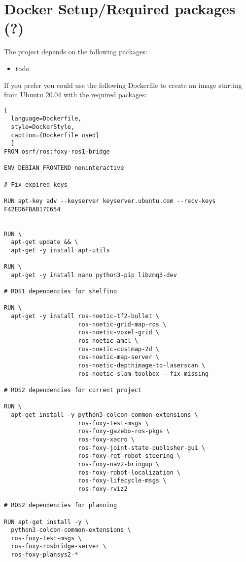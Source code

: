\chapter{Docker Setup/Required packages (?)}
\label{cha:dockerfile}

The project depends on the following packages:

\begin{itemize}
    \item todo
\end{itemize}

If you prefer you could use the following Dockerfile to create an image starting from Ubuntu 20.04 with the required packages:

\begin{lstlisting}[
  language=Dockerfile,
  style=DockerStyle,
  caption={Dockerfile used}
  ]
FROM osrf/ros:foxy-ros1-bridge

ENV DEBIAN_FRONTEND noninteractive

# Fix expired keys

RUN apt-key adv --keyserver keyserver.ubuntu.com --recv-keys F42ED6FBAB17C654


RUN \
  apt-get update && \
  apt-get -y install apt-utils

RUN \
  apt-get -y install nano python3-pip libzmq3-dev

# ROS1 dependencies for shelfino
  
RUN \
  apt-get -y install ros-noetic-tf2-bullet \
                     ros-noetic-grid-map-ros \
                     ros-noetic-voxel-grid \
                     ros-noetic-amcl \
                     ros-noetic-costmap-2d \
                     ros-noetic-map-server \
                     ros-noetic-depthimage-to-laserscan \
                     ros-noetic-slam-toolbox --fix-missing

# ROS2 dependencies for current project

RUN \
  apt-get install -y python3-colcon-common-extensions \
                     ros-foxy-test-msgs \
                     ros-foxy-gazebo-ros-pkgs \
                     ros-foxy-xacro \
                     ros-foxy-joint-state-publisher-gui \
                     ros-foxy-rqt-robot-steering \
                     ros-foxy-nav2-bringup \
                     ros-foxy-robot-localization \
                     ros-foxy-lifecycle-msgs \
                     ros-foxy-rviz2

# ROS2 dependencies for planning

RUN apt-get install -y \
  python3-colcon-common-extensions \
  ros-foxy-test-msgs \
  ros-foxy-rosbridge-server \
  ros-foxy-plansys2-*


\end{lstlisting}
